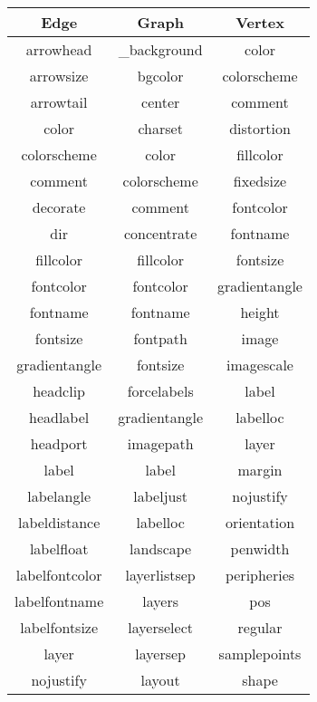 \begin{table}[h!]
  \centering
  \begin{tabular}{c c c} 
    \hline
    Edge           & Graph         & Vertex        \\
    \hline
    arrowhead      & \_background  & color         \\
    arrowsize      & bgcolor       & colorscheme   \\
    arrowtail      & center        & comment       \\
    color          & charset       & distortion    \\
    colorscheme    & color         & fillcolor     \\
    comment        & colorscheme   & fixedsize     \\
    decorate       & comment       & fontcolor     \\
    dir            & concentrate   & fontname      \\
    fillcolor      & fillcolor     & fontsize      \\
    fontcolor      & fontcolor     & gradientangle \\
    fontname       & fontname      & height        \\
    fontsize       & fontpath      & image         \\
    gradientangle  & fontsize      & imagescale    \\
    headclip       & forcelabels   & label         \\
    headlabel      & gradientangle & labelloc      \\
    headport       & imagepath     & layer         \\
    label          & label         & margin        \\
    labelangle     & labeljust     & nojustify     \\
    labeldistance  & labelloc      & orientation   \\
    labelfloat     & landscape     & penwidth      \\
    labelfontcolor & layerlistsep  & peripheries   \\
    labelfontname  & layers        & pos           \\
    labelfontsize  & layerselect   & regular       \\
    layer          & layersep      & samplepoints  \\
    nojustify      & layout        & shape         \\

\end{tabular}
\end{table}
